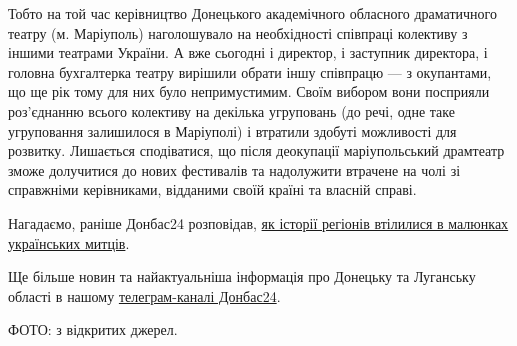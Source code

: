 Тобто на той час керівництво Донецького академічного обласного драматичного
театру (м. Маріуполь) наголошувало на необхідності співпраці колективу з іншими
театрами України. А вже сьогодні і директор, і заступник директора, і головна
бухгалтерка театру вирішили обрати іншу співпрацю — з окупантами, що ще рік
тому для них було непримустимим. Своїм вибором вони посприяли роз'єднанню
всього колективу на декілька угруповань (до речі, одне таке угруповання
залишилося в Маріуполі) і втратили здобуті можливості для розвитку. Лишається
сподіватися, що після деокупації маріупольський драмтеатр зможе долучитися до
нових фестивалів та надолужити втрачене на чолі зі справжніми керівниками,
відданими своїй країні та власній справі. 



Нагадаємо, раніше Донбас24 розповідав, \href{https://donbas24.news/news/potyag-do-peremogi-yak-istoriyi-regioniv-vtililisya-v-malyunkax-ukrayinskix-mitciv-foto}{як історії регіонів втілилися в малюнках
українських митців}.

Ще більше новин та найактуальніша інформація про Донецьку та Луганську області
в нашому \href{https://t.me/donbas24/}{телеграм-каналі Донбас24}.

ФОТО: з відкритих джерел.

